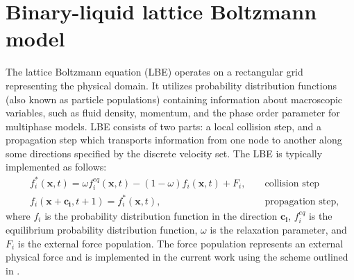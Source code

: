 \documentclass{article}
\begin{document}
\pagebreak 
\section{Binary-liquid lattice Boltzmann model}
The lattice Boltzmann equation (LBE) operates on a rectangular grid representing the physical domain. It utilizes probability distribution functions (also known as particle populations) containing information about macroscopic variables, such as fluid density, momentum, and the phase order parameter for multiphase models. LBE consists of two parts: a local collision step, and a propagation step which transports information from one node to another along some 
directions specified by the discrete velocity set. The LBE is typically implemented as follows:
\begin{equation}
\label{standard:implementation}
\begin{aligned}
&f_i^{*}(\bm{x},t)=\omega f_i^{eq}(\bm{x},t)-(1-\omega) f_i(\bm{x},t) +
F_i,&&\text{ collision step}\\
&f_i(\bm{x}+\bm{c_i},t+1)=f_i^{*}(\bm{x},t),&&\text{ propagation step}, 
\end{aligned}
\end{equation}
where $f_i$ is the probability distribution function in the direction $\bm{c_i}$,
 $f_i^{eq}$ is the equilibrium probability distribution function, $\omega$ is the relaxation parameter, and $F_i$ is the external force population. The force population represents an external physical force and is implemented in the current work using the scheme outlined in \citet{guo}.
\end{document}
